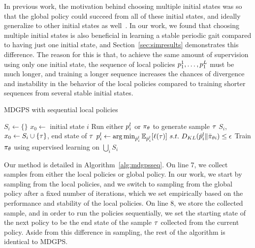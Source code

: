 In previous work, the motivation behind choosing multiple initial states was so
that the global policy could succeed from all of these initial states, and
ideally generalize to other initial states as well~\cite{lfda-eetdv-16}. In our
work, we found that choosing multiple initial states is also beneficial in
learning a stable periodic gait compared to having just one initial state, and
Section~\ref{sec:simresults} demonstrates this difference. The reason for this
is that, to achieve the same amount of supervision using only one initial state,
the sequence of local policies $p_1^1,\ldots,p_1^L$ must be much
longer, and training a longer sequence increases the chances of divergence and
instability in the behavior of the local policies compared to training shorter
sequences from several stable initial states.

\setlength{\textfloatsep}{12pt}
\begin{algorithm}[tb]
    \caption{MDGPS with sequential local policies}
    \label{alg:mdgpsseq}
    \begin{algorithmic}[1]
                \STATE $S_i\leftarrow\{\}$
                    \STATE $x_0\leftarrow$ initial state $i$
                        \STATE Run either $p_i^l$ or $\pi_{\theta}$ to
                        generate sample $\tau$
                        \STATE $S_i$, $x_0\leftarrow{S_i}\cup\{\tau\}$, end state of $\tau$
                    \ENDFOR
                \ENDFOR
                    \STATE $p_i^l\leftarrow\operatorname*{arg\,min}_{\hat{p}_i^l}\mathbb{E}_{\hat{p}_i^l}[\ell(\tau)]~s.t.~D_{KL}(\hat{p}_i^l\|\bar{\pi}_{\theta{i}})\leq\epsilon$
                \ENDFOR
            \ENDFOR
            \STATE Train $\pi_{\theta}$ using supervised learning on
            $\bigcup_iS_i$
        \ENDFOR
    \end{algorithmic}
\end{algorithm}

Our method is detailed in Algorithm~\ref{alg:mdgpsseq}. On line 7, we collect
samples from either the local policies or global policy. In our work, we start
by sampling from the local policies, and we switch to sampling from the global
policy after a fixed number of iterations, which we set empirically based on the
performance and stability of the local policies. On line 8, we store the
collected sample, and in order to run the policies sequentially, we set the
starting state of the next policy to be the end state of the sample $\tau$
collected from the current policy. Aside from this difference in sampling, the
rest of the algorithm is identical to MDGPS.


